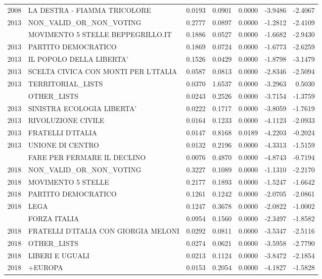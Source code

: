 \begin{longtable}[t]{rlrrrrr}
2008 & LA DESTRA - FIAMMA TRICOLORE & 0.0193 & 0.0901 & 0.0000 & -3.9486 & -2.4067\\
2013 & NON\_VALID\_OR\_NON\_VOTING & 0.2777 & 0.0897 & 0.0000 & -1.2812 & -2.4109\\
\addlinespace
2013 & MOVIMENTO 5 STELLE BEPPEGRILLO.IT & 0.1886 & 0.0527 & 0.0000 & -1.6682 & -2.9430\\
2013 & PARTITO DEMOCRATICO & 0.1869 & 0.0724 & 0.0000 & -1.6773 & -2.6259\\
2013 & IL POPOLO DELLA LIBERTA' & 0.1526 & 0.0429 & 0.0000 & -1.8798 & -3.1479\\
2013 & SCELTA CIVICA CON MONTI PER L'ITALIA & 0.0587 & 0.0813 & 0.0000 & -2.8346 & -2.5094\\
2013 & TERRITORIAL\_LISTS & 0.0370 & 1.6537 & 0.0000 & -3.2963 & 0.5030\\
\addlinespace
2013 & OTHER\_LISTS & 0.0243 & 0.2526 & 0.0000 & -3.7154 & -1.3759\\
2013 & SINISTRA ECOLOGIA LIBERTA' & 0.0222 & 0.1717 & 0.0000 & -3.8059 & -1.7619\\
2013 & RIVOLUZIONE CIVILE & 0.0164 & 0.1233 & 0.0000 & -4.1123 & -2.0933\\
2013 & FRATELLI D'ITALIA & 0.0147 & 0.8168 & 0.0189 & -4.2203 & -0.2024\\
2013 & UNIONE DI CENTRO & 0.0132 & 0.2196 & 0.0000 & -4.3313 & -1.5159\\
\addlinespace
2013 & FARE PER FERMARE IL DECLINO & 0.0076 & 0.4870 & 0.0000 & -4.8743 & -0.7194\\
2018 & NON\_VALID\_OR\_NON\_VOTING & 0.3227 & 0.1089 & 0.0000 & -1.1310 & -2.2170\\
2018 & MOVIMENTO 5 STELLE & 0.2177 & 0.1893 & 0.0000 & -1.5247 & -1.6642\\
2018 & PARTITO DEMOCRATICO & 0.1261 & 0.1242 & 0.0000 & -2.0705 & -2.0861\\
2018 & LEGA & 0.1247 & 0.3678 & 0.0000 & -2.0822 & -1.0002\\
\addlinespace
2018 & FORZA ITALIA & 0.0954 & 0.1560 & 0.0000 & -2.3497 & -1.8582\\
2018 & FRATELLI D'ITALIA CON GIORGIA MELONI & 0.0292 & 0.0811 & 0.0000 & -3.5347 & -2.5116\\
2018 & OTHER\_LISTS & 0.0274 & 0.0621 & 0.0000 & -3.5958 & -2.7790\\
2018 & LIBERI E UGUALI & 0.0213 & 0.1124 & 0.0000 & -3.8472 & -2.1854\\
2018 & +EUROPA & 0.0153 & 0.2054 & 0.0000 & -4.1827 & -1.5828\\

\end{longtable}
